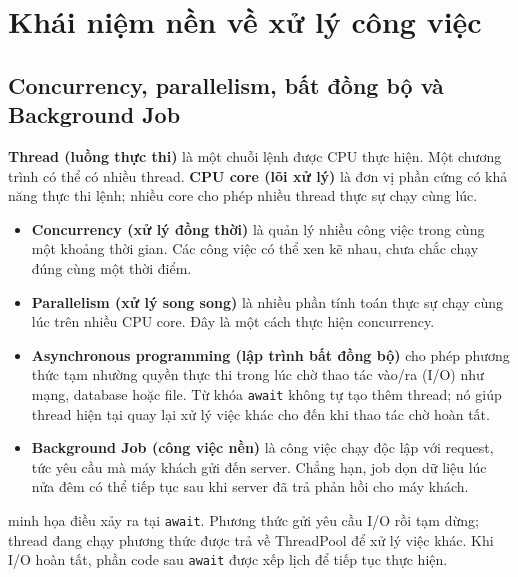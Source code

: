 \section{Khái niệm nền về xử lý công việc}

\subsection{Concurrency, parallelism, bất đồng bộ và Background Job}

\textbf{Thread (luồng thực thi)} là một chuỗi lệnh được CPU thực hiện. Một chương
trình có thể có nhiều thread. \textbf{CPU core (lõi xử lý)} là đơn vị phần cứng có
khả năng thực thi lệnh; nhiều core cho phép nhiều thread thực sự chạy cùng lúc.

\begin{itemize}
  \item \textbf{Concurrency (xử lý đồng thời)} là quản lý nhiều công việc trong cùng
  một khoảng thời gian. Các công việc có thể xen kẽ nhau, chưa chắc chạy đúng cùng
  một thời điểm.

  \item \textbf{Parallelism (xử lý song song)} là nhiều phần tính toán thực sự chạy
  cùng lúc trên nhiều CPU core. Đây là một cách thực hiện concurrency.

  \item \textbf{Asynchronous programming (lập trình bất đồng bộ)} cho phép phương
  thức tạm nhường quyền thực thi trong lúc chờ thao tác vào/ra (I/O) như mạng,
  database hoặc file. Từ khóa \texttt{await} không tự tạo thêm thread; nó giúp
  thread hiện tại quay lại xử lý việc khác cho đến khi thao tác chờ hoàn tất.

  \item \textbf{Background Job (công việc nền)} là công việc chạy độc lập với
  request, tức yêu cầu mà máy khách gửi đến server. Chẳng hạn, job dọn dữ liệu lúc
  nửa đêm có thể tiếp tục sau khi server đã trả phản hồi cho máy khách.
\end{itemize}

 minh họa điều xảy ra tại \texttt{await}. Phương thức gửi
yêu cầu I/O rồi tạm dừng; thread đang chạy phương thức được trả về ThreadPool để xử
lý việc khác. Khi I/O hoàn tất, phần code sau \texttt{await} được xếp lịch để tiếp
tục thực hiện.

\begin{center}
\resizebox{0.84\textwidth}{!}{}
\label{fig:async-io-flow}
\end{center}

